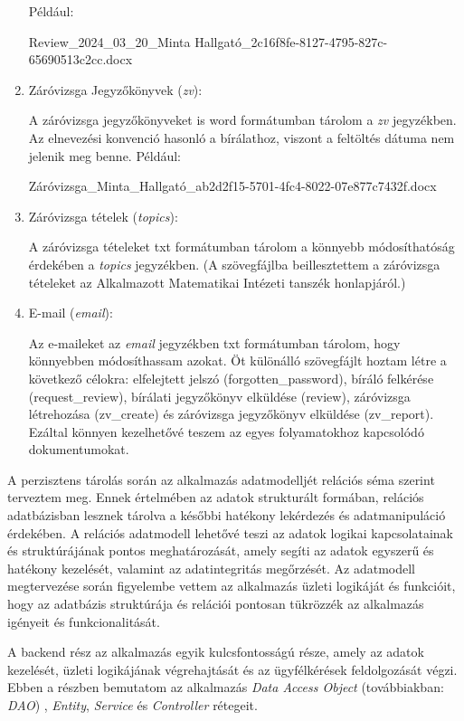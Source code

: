 \begin{enumerate}
\begin{itemize}
\end{itemize}

Például:

Review\_2024\_03\_20\_Minta Hallgató\_2c16f8fe-8127-4795-827c-65690513c2cc.docx


\item{Záróvizsga Jegyzőkönyvek (\textit{zv}):}

A záróvizsga jegyzőkönyveket is word formátumban tárolom a \textit{zv} jegyzékben. Az elnevezési konvenció hasonló a bírálathoz, viszont a feltöltés dátuma nem jelenik meg benne. Például: 

Záróvizsga\_Minta\_Hallgató\_ab2d2f15-5701-4fc4-8022-07e877c7432f.docx

\item{Záróvizsga tételek (\textit{topics}):}

A záróvizsga tételeket txt formátumban tárolom a könnyebb módosíthatóság érdekében a \textit{topics} jegyzékben. (A szövegfájlba beillesztettem a záróvizsga tételeket az Alkalmazott Matematikai Intézeti tanszék honlapjáról.)


\item{E-mail (\textit{email}):}

Az e-maileket az \textit{email} jegyzékben txt formátumban tárolom, hogy könnyebben módosíthassam azokat. Öt különálló szövegfájlt hoztam létre a következő célokra: elfelejtett jelszó (forgotten\_password), bíráló felkérése (request\_review), bírálati jegyzőkönyv elküldése (review), záróvizsga létrehozása (zv\_create) és záróvizsga jegyzőkönyv elküldése (zv\_report). Ezáltal könnyen kezelhetővé teszem az egyes folyamatokhoz kapcsolódó dokumentumokat.

\end{enumerate}

A perzisztens tárolás során az alkalmazás adatmodelljét relációs séma szerint terveztem meg. Ennek értelmében az adatok strukturált formában, relációs adatbázisban lesznek tárolva a későbbi hatékony lekérdezés és adatmanipuláció érdekében. A relációs adatmodell lehetővé teszi az adatok logikai kapcsolatainak és struktúrájának pontos meghatározását, amely segíti az adatok egyszerű és hatékony kezelését, valamint az adatintegritás megőrzését. Az adatmodell megtervezése során figyelembe vettem az alkalmazás üzleti logikáját és funkcióit, hogy az adatbázis struktúrája és relációi pontosan tükrözzék az alkalmazás igényeit és funkcionalitását.


A backend rész az alkalmazás egyik kulcsfontosságú része, amely az adatok kezelését, üzleti logikájának végrehajtását és az ügyfélkérések feldolgozását végzi. Ebben a részben bemutatom az alkalmazás \textit{Data Access Object} (továbbiakban: \textit{DAO}) \cite{DAO}, \textit{Entity}, \textit{Service} és \textit{Controller} rétegeit.

